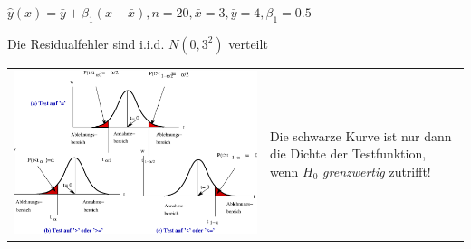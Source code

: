 \documentclass[a4paper]{foils}
\begin{document}
\begin{landscape}
\begin{center}
$\hat{y}(x)=\bar{y}+\beta_1(x-\bar{x}), 
n=20, \bar{x}=3, \bar{y}=4, \beta_1=0.5$
\vspace{-2.3em}

\vspace{-1em}

Die Residualfehler sind i.i.d. $N(0, 3^2)$ verteilt 



\newpage
\vspace{3em}


\newpage

\vspace{0.5em}
\begin{tabular}{ll}
\includegraphics[width=1.0\textwidth]{figsRegr/annahmeAblehn_einZweiseit.eps}
&
\parbox{0.3\textwidth}{\vspace{-1.1\textwidth}Die schwarze Kurve ist nur dann die Dichte der Testfunktion, wenn
$H_0$ \emph{grenzwertig} zutrifft!}
\end{tabular}



\end{center}
\end{landscape}
\end{document}
